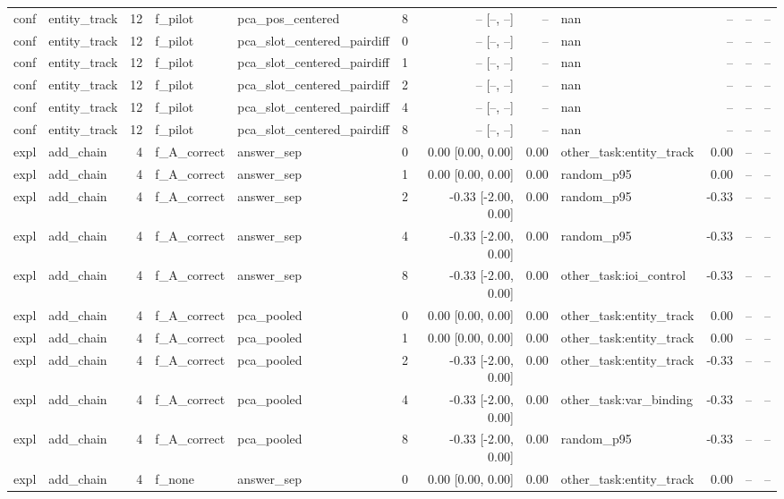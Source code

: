 \begin{tabular}{llrllrrrlrrr}
conf & entity\_track & 12 & f\_pilot & pca\_pos\_centered & 8 & -- [--, --] & -- & nan & -- & -- & -- \\
conf & entity\_track & 12 & f\_pilot & pca\_slot\_centered\_pairdiff & 0 & -- [--, --] & -- & nan & -- & -- & -- \\
conf & entity\_track & 12 & f\_pilot & pca\_slot\_centered\_pairdiff & 1 & -- [--, --] & -- & nan & -- & -- & -- \\
conf & entity\_track & 12 & f\_pilot & pca\_slot\_centered\_pairdiff & 2 & -- [--, --] & -- & nan & -- & -- & -- \\
conf & entity\_track & 12 & f\_pilot & pca\_slot\_centered\_pairdiff & 4 & -- [--, --] & -- & nan & -- & -- & -- \\
conf & entity\_track & 12 & f\_pilot & pca\_slot\_centered\_pairdiff & 8 & -- [--, --] & -- & nan & -- & -- & -- \\
expl & add\_chain & 4 & f\_A\_correct & answer\_sep & 0 & 0.00 [0.00, 0.00] & 0.00 & other\_task:entity\_track & 0.00 & -- & -- \\
expl & add\_chain & 4 & f\_A\_correct & answer\_sep & 1 & 0.00 [0.00, 0.00] & 0.00 & random\_p95 & 0.00 & -- & -- \\
expl & add\_chain & 4 & f\_A\_correct & answer\_sep & 2 & -0.33 [-2.00, 0.00] & 0.00 & random\_p95 & -0.33 & -- & -- \\
expl & add\_chain & 4 & f\_A\_correct & answer\_sep & 4 & -0.33 [-2.00, 0.00] & 0.00 & random\_p95 & -0.33 & -- & -- \\
expl & add\_chain & 4 & f\_A\_correct & answer\_sep & 8 & -0.33 [-2.00, 0.00] & 0.00 & other\_task:ioi\_control & -0.33 & -- & -- \\
expl & add\_chain & 4 & f\_A\_correct & pca\_pooled & 0 & 0.00 [0.00, 0.00] & 0.00 & other\_task:entity\_track & 0.00 & -- & -- \\
expl & add\_chain & 4 & f\_A\_correct & pca\_pooled & 1 & 0.00 [0.00, 0.00] & 0.00 & other\_task:entity\_track & 0.00 & -- & -- \\
expl & add\_chain & 4 & f\_A\_correct & pca\_pooled & 2 & -0.33 [-2.00, 0.00] & 0.00 & other\_task:entity\_track & -0.33 & -- & -- \\
expl & add\_chain & 4 & f\_A\_correct & pca\_pooled & 4 & -0.33 [-2.00, 0.00] & 0.00 & other\_task:var\_binding & -0.33 & -- & -- \\
expl & add\_chain & 4 & f\_A\_correct & pca\_pooled & 8 & -0.33 [-2.00, 0.00] & 0.00 & random\_p95 & -0.33 & -- & -- \\
expl & add\_chain & 4 & f\_none & answer\_sep & 0 & 0.00 [0.00, 0.00] & 0.00 & other\_task:entity\_track & 0.00 & -- & -- \\

\end{tabular}
